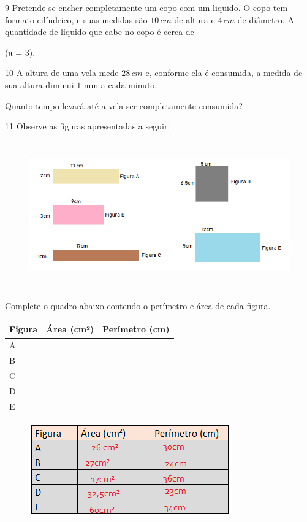 \num{9}  Pretende-se encher completamente um copo com um liquido. O copo tem
formato cilíndrico, e suas medidas são $10\,cm$ de altura e $4\,cm$ de
diâmetro. A quantidade de liquido que cabe no copo é cerca de

(π = $3$).


\num{10}  A altura de uma vela mede $28\,cm$ e, conforme ela é consumida, a
medida de sua altura diminui $1$ mm a cada minuto.

Quanto tempo levará até a vela ser completamente consumida?


\num{11}  Observe as figuras apresentadas a seguir:

\begin{figure}
\includegraphics[width=5.90625in,height=2.51042in]{./imgSAEB_6_MAT/media/image98.png}
\end{figure}

Complete o quadro abaixo contendo o perímetro e área de cada figura.


\begin{longtable}[]{@{}lll@{}}
\toprule
Figura & Área (cm²) & Perímetro (cm)\tabularnewline
\midrule
\endhead
A & ~ & ~\tabularnewline
B & ~ & ~\tabularnewline
C & ~ & ~\tabularnewline
D & ~ & ~\tabularnewline
E & ~ & ~\tabularnewline
\bottomrule
\end{longtable}


\begin{figure}
\includegraphics[width=3.44792in,height=1.58333in]{./imgSAEB_6_MAT/media/image99.png}
\end{figure}

